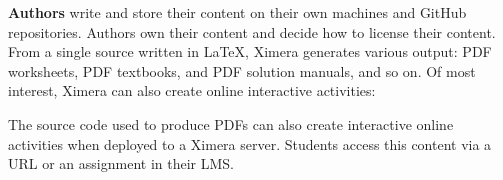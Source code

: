 \documentclass[twocolumn]{article}
\begin{document}
\begin{xframe}
    {\sffamily\bfseries Authors}  write and store their content on their own
    machines and GitHub repositories.
    Authors own their content and decide how to license their content. From a
    single source written in \LaTeX, Ximera generates various output: PDF
    worksheets,
    PDF textbooks, and	PDF solution manuals, and so on. Of most interest,
    Ximera can
    also create online interactive activities:
    \begin{center}
    \end{center}
    The source code used to produce PDFs can also create interactive online activities when deployed to a Ximera server. Students access this content via a URL or an assignment in their LMS.
\end{xframe}
\end{document}
